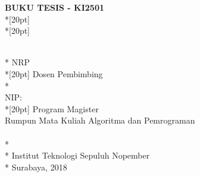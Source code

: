 \newpage

  \sffamily
  \thispagestyle{empty}
  \begin{spacing}{2.0}
    {\noindent
      \textbf{BUKU TESIS - KI2501}\\*[20pt]
      {\large\textbf{\MakeUppercase{\judul}}} \\*[20pt]
    }
  \end{spacing}
  \begin{spacing}{1.3}
  {\large \noindent
    \MakeUppercase{\penulis} \\*
    NRP \nrplama \\*[20pt]
    Dosen Pembimbing\\*
    \pembimbingsatu \\
    NIP: \nikpembimbingsatu \\*[20pt]
    Program Magister\\
    Rumpun Mata Kuliah Algoritma dan Pemrograman\\
    \MakeUppercase{\jurusanbaru} \\*
    \fakultasbaru \\*
    Institut Teknologi Sepuluh Nopember \\*
    Surabaya, 2018
  }
  \end{spacing}
  \rmfamily
  \normalsize
  \restoregeometry
  \cleardoublepage
  
